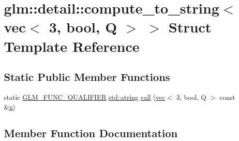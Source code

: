 \hypertarget{structglm_1_1detail_1_1compute__to__string_3_01vec_3_013_00_01bool_00_01_q_01_4_01_4}{}\section{glm\+:\+:detail\+:\+:compute\+\_\+to\+\_\+string$<$ vec$<$ 3, bool, Q $>$ $>$ Struct Template Reference}
\label{structglm_1_1detail_1_1compute__to__string_3_01vec_3_013_00_01bool_00_01_q_01_4_01_4}
\subsection*{Static Public Member Functions}
\begin{DoxyCompactItemize}
\item 
static \mbox{\hyperlink{setup_8hpp_a33fdea6f91c5f834105f7415e2a64407}{G\+L\+M\+\_\+\+F\+U\+N\+C\+\_\+\+Q\+U\+A\+L\+I\+F\+I\+ER}} \mbox{\hyperlink{_s_d_l__opengl__glext_8h_ae84541b4f3d8e1ea24ec0f466a8c568b}{std\+::string}} \mbox{\hyperlink{structglm_1_1detail_1_1compute__to__string_3_01vec_3_013_00_01bool_00_01_q_01_4_01_4_a05dff60a280662ac95d5e22eae28c730}{call}} (\mbox{\hyperlink{structglm_1_1vec}{vec}}$<$ 3, bool, Q $>$ const \&\mbox{\hyperlink{_s_d_l__opengl_8h_ad0e63d0edcdbd3d79554076bf309fd47}{x}})
\end{DoxyCompactItemize}


\subsection{Member Function Documentation}
\mbox{\label{structglm_1_1detail_1_1compute__to__string_3_01vec_3_013_00_01bool_00_01_q_01_4_01_4_a05dff60a280662ac95d5e22eae28c730}} 
